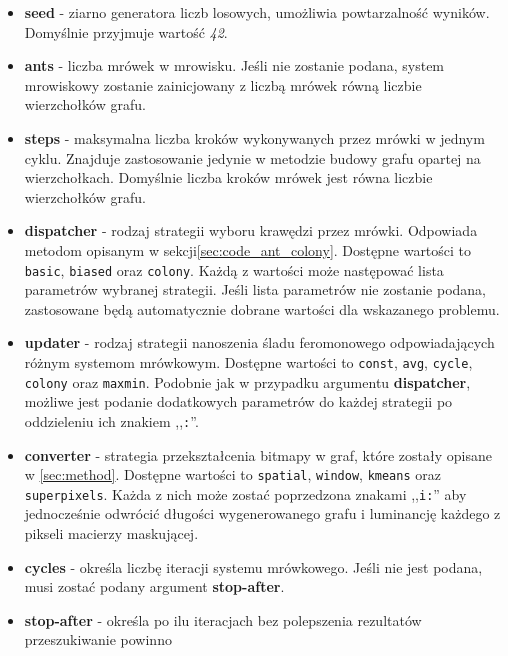 {{{            \begin{itemize}
                \item \textbf{seed} - ziarno generatora liczb losowych, umożliwia powtarzalność wyników. Domyślnie
                przyjmuje wartość \textit{42}.
                \item \textbf{ants} - liczba mrówek w mrowisku. Jeśli nie zostanie podana, system mrowiskowy zostanie
                zainicjowany z liczbą mrówek równą liczbie wierzchołków grafu.
                \item \textbf{steps} - maksymalna liczba kroków wykonywanych przez mrówki w jednym cyklu. Znajduje
                zastosowanie jedynie w metodzie budowy grafu opartej na wierzchołkach. Domyślnie liczba kroków mrówek
                jest równa liczbie wierzchołków grafu.
                \item \textbf{dispatcher} - rodzaj strategii wyboru krawędzi przez mrówki. Odpowiada metodom opisanym w
                sekcji\ref{sec:code_ant_colony}. Dostępne wartości to \texttt{basic}, \texttt{biased} oraz
                \texttt{colony}. Każdą z wartości może następować lista parametrów wybranej strategii. Jeśli lista
                parametrów nie zostanie podana, zastosowane będą automatycznie dobrane wartości dla wskazanego problemu.
                \item \textbf{updater} - rodzaj strategii nanoszenia śladu feromonowego odpowiadających różnym systemom
                mrówkowym. Dostępne wartości to \texttt{const}, \texttt{avg}, \mbox{\texttt{cycle},} \texttt{colony} oraz \texttt{maxmin}. Podobnie jak w przypadku argumentu \textbf{dispatcher},
                możliwe jest podanie dodatkowych parametrów do każdej strategii po oddzieleniu ich znakiem
                ,,\texttt{:}''.
                \item \textbf{converter} - strategia przekształcenia bitmapy w graf, które zostały opisane w
                \ref{sec:method}. Dostępne wartości to \texttt{spatial}, \texttt{window}, \texttt{kmeans} oraz
                \texttt{superpixels}. Każda z nich może zostać poprzedzona znakami ,,\texttt{i:}'' aby jednocześnie
                odwrócić długości wygenerowanego grafu i luminancję każdego z pikseli macierzy maskującej.
                \item \textbf{cycles} - określa liczbę iteracji systemu mrówkowego. Jeśli nie jest podana, musi zostać
                podany argument \textbf{stop-after}.
                \item \textbf{stop-after} - określa po ilu iteracjach bez polepszenia rezultatów przeszukiwanie powinno

\end{itemize}}}}
